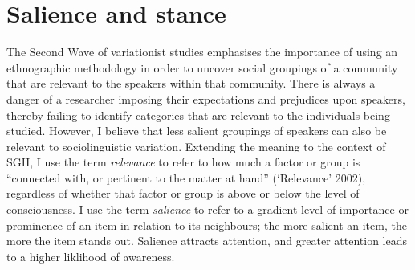 \section{Salience and stance}\label{sec:salience}
The Second Wave of variationist studies emphasises the importance of using an ethnographic methodology in order to uncover social groupings of a community that are relevant to the speakers within that community. There is always a danger of a researcher imposing their expectations and prejudices upon speakers, thereby failing to identify categories that are relevant to the individuals being studied. However, I believe that less salient groupings of speakers can also be relevant to sociolinguistic variation. Extending the meaning to the context of SGH, I use the term \textit{relevance} to refer to how much a factor or group is ``connected with, or pertinent to the matter at hand'' (`Relevance' 2002), regardless of whether that factor or group is above or below the level of consciousness. I use the term \textit{salience} to refer to a gradient level of importance or prominence of an item in relation to its neighbours; the more salient an item, the more the item stands out. Salience attracts attention, and greater attention leads to a higher liklihood of awareness.

